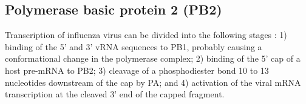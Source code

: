 
\subsection{Polymerase basic protein 2 (PB2)}

Transcription of influenza virus can be divided into the following stages \citep{1236}: 1) binding of the 5' and 3' vRNA sequences to PB1, probably causing a conformational change in the polymerase complex; 2) binding of the 5' cap of a host pre-mRNA to PB2; 3) cleavage of a phosphodiester bond 10 to 13 nucleotides downstream of the cap by PA; and 4) activation of the viral mRNA transcription at the cleaved 3' end of the capped fragment.

